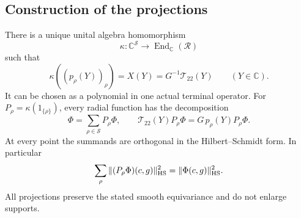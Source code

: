 \subsection{Construction of the projections}

\begin{theorem}\label{rd-constructed-kappa}
There is a unique unital algebra homomorphism
\[
       \kappa:\mathbb C^{\mathcal S}
                    \longrightarrow
                         \operatorname{End}_{\mathbb C}(\mathscr R)
\]
such that
\begin{equation}\label{rd-kappa-identity}
       \kappa((p_\rho(Y))_\rho)
                =X(Y)=G^{-1}\mathcal T_{22}(Y)
                            \qquad(Y\in\mathbb C).
\end{equation}
It can be chosen as a polynomial in one actual
terminal operator.  For
$P_\rho=\kappa(1_{\{\rho\}})$, every radial
function has the decomposition
\begin{equation}\label{rd-decomposition}
 \Phi=\sum_{\rho\in\mathcal S}P_\rho\Phi,\qquad
 \mathcal T_{22}(Y)P_\rho\Phi
                        =G\,p_\rho(Y)P_\rho\Phi.
\end{equation}
At every point the summands are orthogonal in
the Hilbert--Schmidt form.  In particular
\begin{equation}\label{rd-pointwise-contraction}
 \sum_\rho\|(P_\rho\Phi)(c,g)\|_{\rm HS}^2
                      =\|\Phi(c,g)\|_{\rm HS}^2 .
\end{equation}
All projections preserve the stated smooth
equivariance and do not enlarge supports.
\end{theorem}

